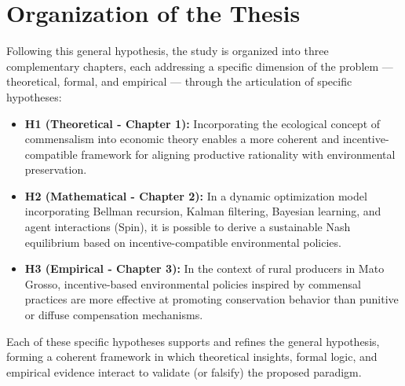 
\section{Organization of the Thesis}

Following this general hypothesis, the study is organized into three complementary chapters, each addressing a specific dimension of the problem — theoretical, formal, and empirical — through the articulation of specific hypotheses:

\begin{itemize}
    \item \textbf{H1 (Theoretical - Chapter 1):} Incorporating the ecological concept of commensalism into economic theory enables a more coherent and incentive-compatible framework for aligning productive rationality with environmental preservation.
    
    \item \textbf{H2 (Mathematical - Chapter 2):} In a dynamic optimization model incorporating Bellman recursion, Kalman filtering, Bayesian learning, and agent interactions (Spin), it is possible to derive a sustainable Nash equilibrium based on incentive-compatible environmental policies.
    
    \item \textbf{H3 (Empirical - Chapter 3):} In the context of rural producers in Mato Grosso, incentive-based environmental policies inspired by commensal practices are more effective at promoting conservation behavior than punitive or diffuse compensation mechanisms.
\end{itemize}

Each of these specific hypotheses supports and refines the general hypothesis, forming a coherent framework in which theoretical insights, formal logic, and empirical evidence interact to validate (or falsify) the proposed paradigm.



